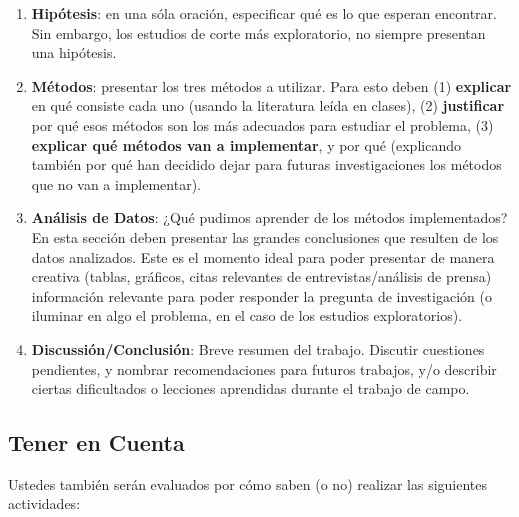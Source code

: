 \documentclass[letterpaper]{article}
\renewenvironment{itemize}{
  \begin{list}{}{
    \setlength{\leftmargin}{1.5em}
  }
}{
  \end{list}
}
\begin{document}
\begin{enumerate}
\begin{itemize}
\end{itemize}

\item {\bf Hip\'otesis}: en una s\'ola oraci\'on, especificar qu\'e es lo que esperan encontrar. Sin embargo, los estudios de corte m\'as exploratorio, no siempre presentan una hip\'otesis.

\item{\bf M\'etodos}: presentar los tres m\'etodos a utilizar. Para esto deben (1) {\bf explicar} en qu\'e consiste cada uno (usando la literatura le\'ida en clases), (2) {\bf justificar} por qu\'e esos m\'etodos son los m\'as adecuados para estudiar el problema, (3) {\bf explicar qu\'e m\'etodos van a implementar}, y por qu\'e (explicando tambi\'en por qu\'e han decidido dejar para futuras investigaciones los m\'etodos que no van a implementar).


\item {\bf An\'alisis de Datos}: ¿Qu\'e pudimos aprender de los m\'etodos implementados? En esta secci\'on deben presentar las grandes conclusiones que resulten de los datos analizados. Este es el momento ideal para poder presentar de manera creativa (tablas, gr\'aficos, citas relevantes de entrevistas/an\'alisis de prensa) informaci\'on relevante para poder responder la pregunta de investigaci\'on (o iluminar en algo el problema, en el caso de los estudios exploratorios).

\item {\bf Discussi\'on/Conclusi\'on}: Breve resumen del trabajo. Discutir cuestiones pendientes, y nombrar recomendaciones para futuros trabajos, y/o describir ciertas dificultados o lecciones aprendidas durante el trabajo de campo.


\end{enumerate}





\subsection*{Tener en Cuenta}

Ustedes tambi\'en ser\'an evaluados por c\'omo saben (o no) realizar las siguientes actividades:
\end{document}
